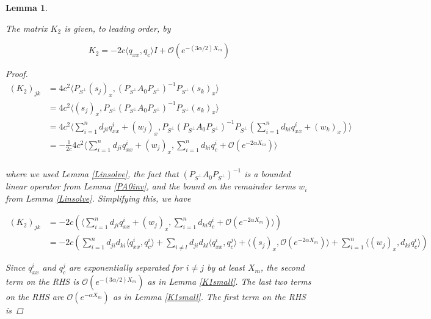 \documentclass[12pt]{article}
\newtheorem{lemma}{Lemma}
\begin{document}

\begin{lemma}\label{K2exp}

The matrix $K_2$ is given, to leading order, by

\begin{equation}
K_2 = -2c \langle q_{xx}, q_c \rangle I + \mathcal{O}(e^{-(3 \alpha/2) X_m})
\end{equation}

\begin{proof}

\begin{align*}
(K_2)_{jk} 
&= 4 c^2 \langle P_{S^\perp} (s_j)_{x}, (P_{S^\perp} A_0 P_{S^\perp})^{-1} P_{S^\perp} (s_k)_{x} \rangle \\
&= 4 c^2 \langle (s_j)_{x}, P_{S^\perp}(P_{S^\perp} A_0 P_{S^\perp})^{-1} P_{S^\perp} (s_k)_{x} \rangle \\
&= 4 c^2 \langle \sum_{i = 1}^{n} d_{ji} q^i_{xx} + (w_j)_x, P_{S^\perp} (P_{S^\perp} A_0 P_{S^\perp})^{-1} P_{S^\perp} \left( \sum_{i = 1}^{n} d_{ki} q^i_{xx} + (w_k)_x \right) \rangle \\
&= -\frac{1}{2 c} 4 c^2 
\langle \sum_{i = 1}^{n} d_{ji} q^i_{xx} + (w_j)_x, \sum_{i = 1}^{n} d_{ki} q^i_c + \mathcal{O}(e^{-2 \alpha X_m}) \rangle \\
\end{align*}

where we used Lemma \ref{Linsolve}, the fact that $(P_{S^\perp} A_0 P_{S^\perp})^{-1}$ is a bounded linear operator from Lemma \ref{PA0inv}, and the bound on the remainder terms $w_i$ from Lemma \ref{Linsolve}. Simplifying this, we have

\begin{align*}
(K_2)_{jk} &= -2 c \left( 
\langle \sum_{i = 1}^{n} d_{ji} q^i_{xx} + (w_j)_x, \sum_{i = 1}^{n} d_{ki} q^i_c + \mathcal{O}(e^{-2 \alpha X_m}) \rangle \right) \\
&= -2 c \left( \sum_{i = 1}^{n} d_{ji} d_{ki} \langle q^i_{xx}, q^i_c \rangle
+ \sum_{i\neq l} d_{ji} d_{kl} \langle q^i_{xx}, q^j_c \rangle
+ \langle (s_j)_x,  \mathcal{O}(e^{-2 \alpha X_m}) \rangle 
+ \sum_{i=1}^n \langle (w_j)_x, d_{ki} q^i_c \rangle \right)
\end{align*}

Since $q^i_{xx}$ and $q^j_c$ are exponentially separated for $i \neq j$ by at least $X_m$, the second term on the RHS is $\mathcal{O}(e^{-(3 \alpha/2) X_m})$ as in Lemma \ref{K1small}. The last two terms on the RHS are $\mathcal{O}(e^{-\alpha X_m})$ as in Lemma \ref{K1small}. The first term on the RHS is


\end{proof}
\end{lemma}
\end{document}
